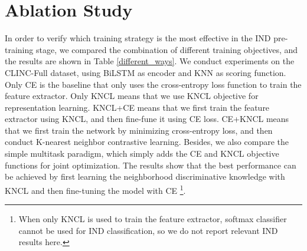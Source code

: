 \documentclass[11pt]{article}
\begin{document}
\section{Ablation Study}
\label{ablation}

In order to verify which training strategy is the most effective in the IND pre-training stage, we compared the combination of different training objectives, and the results are shown in Table \ref{different_ways}. We conduct experiments on the CLINC-Full dataset, using BiLSTM as encoder and KNN as scoring function. Only CE is the baseline that only uses the cross-entropy loss function to train the feature extractor. Only KNCL means that we use KNCL objective for representation learning. KNCL+CE means that we first train the feature extractor using KNCL, and then fine-fune it using CE loss. CE+KNCL means that we first train the network by minimizing cross-entropy loss, and then conduct K-nearest neighbor contrastive learning. Besides, we also compare the simple multitask paradigm, which simply adds the CE and KNCL objective functions for joint optimization. The results show that the best performance can be achieved by first learning the neighborhood discriminative knowledge with KNCL and then fine-tuning the model with CE \footnote{When only KNCL is used to train the feature extractor, softmax classifier cannot be used for IND classification, so we do not report relevant IND results here.}.
\end{document}
